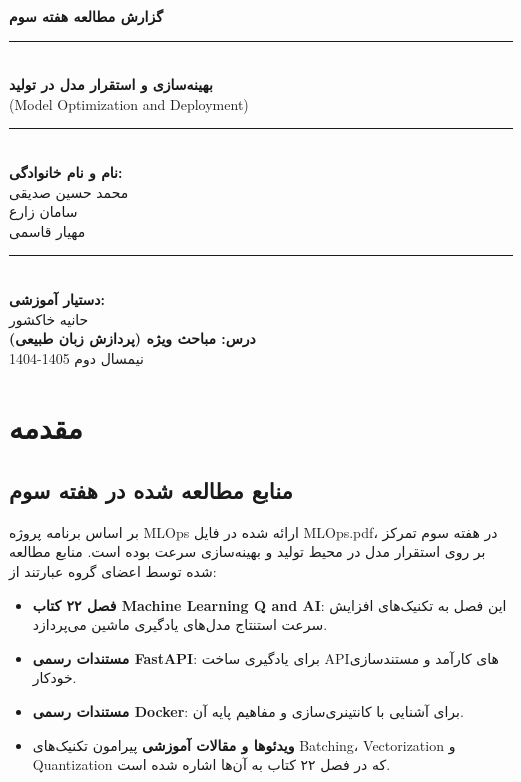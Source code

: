 \documentclass[12pt,a4paper]{report}
\newcommand{\eng}[1]{\textenglish{#1}}
\begin{document}
	
	\begin{titlepage}
		\thispagestyle{empty}
		\centering
		
		{\fontsize{22}{28}\selectfont\textbf{گزارش مطالعه هفته سوم}}\\[0.8cm]
		\rule{\textwidth}{1.5pt}\\[1cm]
		
		{\Large\textbf{بهینه‌سازی و استقرار مدل در تولید}}\\[0.5cm]
		{\large(\eng{Model Optimization and Deployment})}\\[2.5cm]
		
		\begin{minipage}{0.7\textwidth}
			\centering
			\rule{0.8\textwidth}{0.5pt}\\[0.5cm]
			\textbf{نام و نام خانوادگی:}\\[0.3cm]
			\textnormal{محمد حسین صدیقی}\\[0.3cm]
			\textnormal{سامان زارع}\\[0.3cm]
			\textnormal{مهیار قاسمی}\\[0.8cm]
			\rule{0.8\textwidth}{0.5pt}
		\end{minipage}\\[2.5cm]
		
		\textbf{دستیار آموزشی:}\\
		\textnormal{حانیه خاکشور}\\[1cm]
		
		\textbf{درس: مباحث ویژه (پردازش زبان طبیعی)}\\
		\textnormal{نیمسال دوم \eng{1405-1404}}\\[1cm]
		\vfill
	\end{titlepage}
	
	\newpage
	\tableofcontents
	\newpage
	
	\chapter{مقدمه}
	
	\section{منابع مطالعه شده در هفته سوم}
	بر اساس برنامه پروژه \eng{MLOps} ارائه شده در فایل \eng{MLOps.pdf}، در هفته سوم تمرکز بر روی استقرار مدل در محیط تولید و بهینه‌سازی سرعت بوده است. منابع مطالعه شده توسط اعضای گروه عبارتند از:
	
	\begin{itemize}
		\item \textbf{فصل ۲۲ کتاب \eng{Machine Learning Q and AI}}: این فصل به تکنیک‌های افزایش سرعت استنتاج مدل‌های یادگیری ماشین می‌پردازد.
		\item \textbf{مستندات رسمی \eng{FastAPI}}: برای یادگیری ساخت \eng{API}های کارآمد و مستندسازی خودکار.
		\item \textbf{مستندات رسمی \eng{Docker}}: برای آشنایی با کانتینری‌سازی و مفاهیم پایه آن.
		\item \textbf{ویدئوها و مقالات آموزشی} پیرامون تکنیک‌های \eng{Batching}، \eng{Vectorization} و \eng{Quantization} که در فصل ۲۲ کتاب به آن‌ها اشاره شده است.
	\end{itemize}
	
\end{document}
